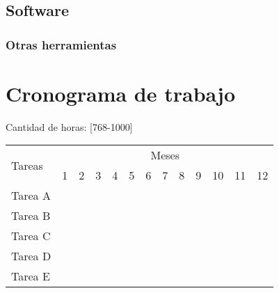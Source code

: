 \documentclass[12pt]{article}
\begin{document}
\subsection{Software}

\subsubsection{Otras herramientas}

\bigskip


\section{Cronograma de trabajo}

Cantidad de horas: [768-1000]

\bigskip

\begin{center}
    \def\arraystretch{1.5}
    \begin{tabular}{ |l|c|c|c|c|c|c|c|c|c|c|c|c| }

        \hline
        \multirow{2}{1em}{Tareas} & \multicolumn{12}{|c|}{Meses}                                                                                                                                                                      \\  \cline{2-13} &
        1                         & 2                            & 3                & 4                & 5                & 6                & 7                & 8 & 9 & 10 & 11               & 12                                  \\  \hline
        Tarea A                   & \cellcolor{gray}             & \cellcolor{gray} &                  &                  &                  &                  &   &   &    &                  &                  &                  \\
        \hline
        Tarea B                   &                              & \cellcolor{gray} & \cellcolor{gray} &                  &                  &                  &   &   &    &                  &                  &                  \\
        \hline
        Tarea C                   &                              & \cellcolor{gray} & \cellcolor{gray} & \cellcolor{gray} & \cellcolor{gray} & \cellcolor{gray} &   &   &    &                  &                  &                  \\
        \hline
        Tarea D                   &                              &                  &                  &                  &                  &                  &   &   &    &                  &                  &                  \\
        \hline
        Tarea E                   &                              &                  &                  &                  &                  &                  &   &   &    & \cellcolor{gray} & \cellcolor{gray} & \cellcolor{gray} \\
        \hline
    \end{tabular}
\end{center}
\end{document}
